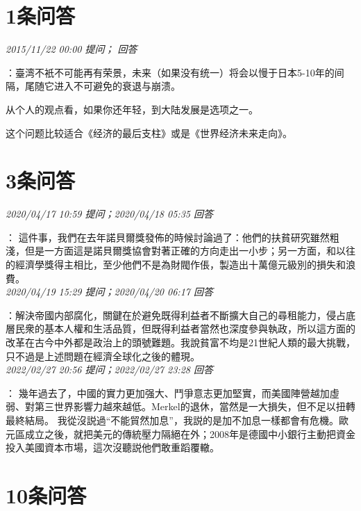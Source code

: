 \documentclass[twocolumn]{ctexart}
\begin{document}
\pagestyle{plain}
\section{1条问答}

\textit{\hfill\noindent\small 2015/11/22 00:00 提问； 回答}

：臺湾不衹不可能再有荣景，未来（如果没有统一）将会以慢于日本5-10年的间隔，尾随它进入不可避免的衰退与崩溃。

从个人的观点看，如果你还年轻，到大陆发展是选项之一。

这个问题比较适合《经济的最后支柱》或是《世界经济未来走向》。\\

\section{3条问答}

\textit{\hfill\noindent\small 2020/04/17 10:59 提问；2020/04/18 05:35 回答}

：
這件事，我們在去年諾貝爾獎發佈的時候討論過了：他們的扶貧研究雖然粗淺，但是一方面這是諾貝爾獎協會對著正確的方向走出一小步；另一方面，和以往的經濟學獎得主相比，至少他們不是為財閥作倀，製造出十萬億元級別的損失和浪費。
\\

\textit{\hfill\noindent\small 2020/04/19 15:29 提问；2020/04/20 06:17 回答}

：解決帝國内部腐化，關鍵在於避免既得利益者不斷擴大自己的尋租能力，侵占底層民衆的基本人權和生活品質，但既得利益者當然也深度參與執政，所以這方面的改革在古今中外都是政治上的頭號難題。我說貧富不均是21世紀人類的最大挑戰，只不過是上述問題在經濟全球化之後的體現。
\\

\textit{\hfill\noindent\small 2022/02/27 20:56 提问；2022/02/27 23:28 回答}

：
幾年過去了，中國的實力更加强大、鬥爭意志更加堅實，而美國陣營越加虛弱、對第三世界影響力越來越低。Merkel的退休，當然是一大損失，但不足以扭轉最終結局。
我從沒説過“不能貿然加息”，我説的是加不加息一樣都會有危機。歐元區成立之後，就把美元的傳統壓力隔絕在外；2008年是德國中小銀行主動把資金投入美國資本市場，這次沒聽説他們敢重蹈覆轍。
\\

\section{10条问答}
\end{document}
